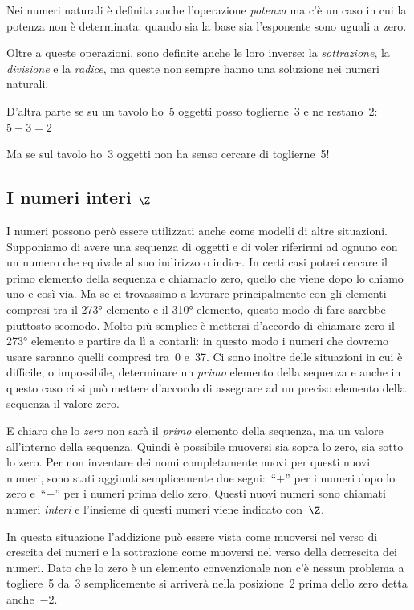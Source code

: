 Nei numeri naturali è definita anche l'operazione \emph{potenza} ma c'è un caso 
in cui la potenza non è determinata: quando sia la base sia l'esponente sono 
uguali a zero.

Oltre a queste operazioni, sono definite anche le loro inverse: la 
\emph{sottrazione}, la \emph{divisione} e la \emph{radice}, ma queste non sempre 
hanno una soluzione nei numeri naturali.

D'altra parte se su un tavolo ho~5 oggetti posso toglierne~3 e ne restano~2: 
\(5-3=2\)

Ma se sul tavolo ho~3 oggetti non ha senso cercare di toglierne~5!

\subsection{I numeri interi \(\Z\)} 
\label{subsec:insnum_interi}

I numeri possono però essere utilizzati anche come modelli di altre situazioni. 
Supponiamo di avere una sequenza di oggetti e di voler riferirmi ad ognuno con 
un 
numero che equivale al suo indirizzo o indice. In certi casi potrei cercare il 
primo elemento della sequenza e chiamarlo zero, quello che viene dopo lo chiamo 
uno e così via. Ma se ci trovassimo a lavorare principalmente con gli elementi 
compresi tra il 273° elemento e il 310° elemento, questo modo di fare sarebbe 
piuttosto scomodo. Molto più semplice è mettersi d'accordo di chiamare zero il 
273° elemento e partire da lì a contarli: in questo modo i numeri che dovremo 
usare saranno quelli compresi tra~0 e~37. 
Ci sono inoltre delle situazioni in cui è difficile, 
o impossibile, determinare un \emph{primo} elemento della sequenza e anche in 
questo caso ci si può mettere d'accordo di assegnare ad un preciso elemento 
della sequenza il valore zero.

E chiaro che lo \emph{zero} non sarà il \emph{primo} elemento della sequenza, ma 
un valore all'interno della sequenza. Quindi è possibile muoversi sia sopra lo 
zero, sia sotto lo zero. Per non inventare dei nomi completamente nuovi per 
questi nuovi numeri, sono stati aggiunti semplicemente due segni:~``\(+\)'' per 
i numeri dopo lo zero e~``\(-\)'' per i numeri prima dello zero. Questi nuovi 
numeri sono chiamati numeri \emph{interi} e l'insieme di questi numeri viene 
indicato con~\(\Z\).

In questa situazione l'addizione può essere vista come muoversi nel verso di 
crescita dei numeri e la sottrazione come muoversi nel verso della decrescita 
dei numeri. Dato che lo zero è un elemento convenzionale non c'è nessun problema 
a togliere~5 da~3 semplicemente si arriverà nella posizione~2 prima dello zero 
detta anche~\(-2\).

